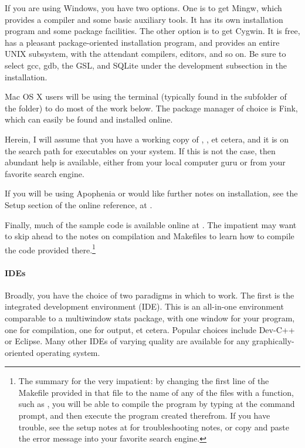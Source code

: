 \documentclass[12pt]{article}
\begin{document}
If you are using Windows, you have two options. One is to get
Mingw, which provides a compiler and some basic auxiliary tools. It has its
own installation program and some package facilities. The other option is to
get Cygwin.  It is free, has a pleasant package-oriented installation
program, and provides an entire UNIX subsystem, with the attendant
compilers, editors, and so on. Be sure to select gcc, gdb, the GSL,
and SQLite under the development subsection in the installation.

Mac OS X users will be using the terminal (typically found in the
 subfolder of the  folder) to do most of the
work below. The package manager of choice is Fink, which can easily be
found and installed online.

Herein, I will assume that you have a working copy of ,
, et cetera, and it is on the search path for executables
on your system. If this is not the case, then abundant help is available,
either from your local computer guru or from your favorite search engine.

If you will be using Apophenia or would like further notes on
installation, see the Setup section of the online reference, at
\onlinereflocation.

Finally, much of the sample code is available online at
\samplecodelocation. The impatient may want to skip ahead to the notes on
compilation and Makefiles to learn how to compile the code provided 
there.\footnote{The summary for the very impatient: by changing the
first line of the Makefile provided in that file to the name of any of the files with
a  function, such as , you will be
able to compile the program by typing  at the command
prompt, and then execute the program created therefrom. If you have
trouble, see the setup notes at \onlinereflocation{} for troubleshooting
notes, or copy and paste the error message into your favorite search
engine.}

\paragraph{IDEs}  
Broadly, you have the choice of two paradigms in which to work. The
first is the integrated development environment (IDE). This is an
all-in-one environment comparable to a multiwindow stats package, with
one window for your program, one for compilation, one for output, et
cetera.  
Popular choices include Dev-C++ or Eclipse. Many other IDEs of varying
quality are available for any graphically-oriented operating system.
\end{document}

